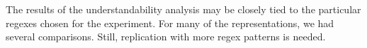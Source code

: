 The results of the understandability analysis may be closely tied to the particular regexes chosen for the experiment. For many of the representations, we had several comparisons. Still, replication with more regex patterns is needed.%



